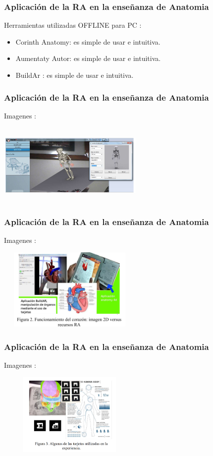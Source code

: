 \documentclass[11pt]{beamer}
\begin{document}
\begin{frame}
\frametitle{Aplicación de la RA en la enseñanza de Anatomia}
\center Herramientas utilizadas OFFLINE para PC : 
\center
\begin{itemize}
\item Corinth Anatomy: es simple de usar e intuitiva.
\item Aumentaty Autor: es simple de usar e intuitiva.
\item BuildAr : es simple de usar e intuitiva. 
\end{itemize}
\end{frame}

\begin{frame}
\frametitle{Aplicación de la RA en la enseñanza de Anatomia}
\center Imagenes : 
\begin{itemize}
\end{itemize}
\includegraphics[width=7cm, height=4cm]{img/sistema_oseo.png}
\end{frame}

\begin{frame}
\frametitle{Aplicación de la RA en la enseñanza de Anatomia}
\center Imagenes : 
\begin{itemize}
\end{itemize}
\includegraphics[width=7cm, height=4cm]{img/comparacion.png}
\end{frame}

\begin{frame}
\frametitle{Aplicación de la RA en la enseñanza de Anatomia}
\center Imagenes : 
\begin{itemize}
\end{itemize}
\includegraphics[width=7cm, height=4cm]{img/tarjeta.png}
\end{frame}
\end{document}
